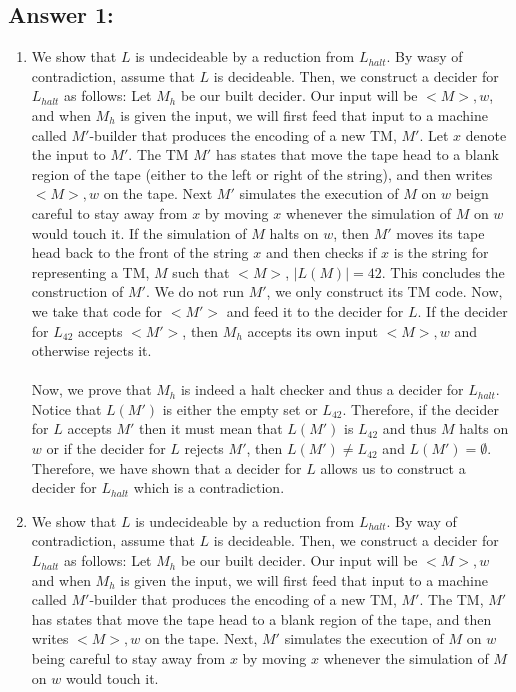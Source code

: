 \documentclass[12pt]{article}
\begin{document}
\subsection*{Answer 1:}
\begin{enumerate}
	\item We show that $L$ is undecideable by a reduction from $L_{halt}$. By wasy of contradiction, assume that $L$ is decideable. Then, we construct a decider for $L_{halt}$ as follows: 
	Let $M_h$ be our built decider. Our input will be $<M>, w$, and when $M_h$ is given the input, we will first feed that input to a machine called $M'$-builder that produces the encoding of a new 
	TM, $M'$. Let $x$ denote the input to $M'$. The TM $M'$ has states that move the tape head to a blank region of the tape (either to the left or right of the string), and then writes $<M>,w$ on the tape.
	Next $M'$ simulates the execution of $M$ on $w$ beign careful to stay away from $x$ by moving $x$ whenever the simulation of $M$ on $w$ would touch it. If the simulation of $M$ halts on $w$, then $M'$ moves its 
	tape head back to the front of the string $x$ and then checks if $x$ is the string for representing a TM, $M$ such that $<M>$, $|L(M)| = 42$. This concludes the construction of $M'$. We do not run $M'$, we only construct its TM code. Now, we take that code for $<M'>$ and feed it to the decider for $L$.
	If the decider for $L_{42}$ accepts $<M'>$, then $M_h$ accepts its own input $<M>, w$ and otherwise rejects it.\\\\
	Now, we prove that $M_h$ is indeed a halt checker and thus a decider for $L_{halt}$. Notice that $L(M')$ is either the empty set or $L_{42}$. Therefore, if the decider for $L$ accepts $M'$ then it must mean that $L(M')$ is $L_{42}$
	and thus $M$ halts on $w$ or if the decider for $L$ rejects $M'$, then $L(M') \neq L_{42}$ and $L(M') = \emptyset$. Therefore, we have shown that a decider for $L$ allows us to construct a decider for $L_{halt}$ which is a contradiction.
	\item We show that $L$ is undecideable by a reduction from $L_{halt}$. By way of contradiction, assume that $L$ is decideable. Then, we construct a decider for $L_{halt}$ as follows: Let $M_h$ be our built decider. Our input will be $<M>,w$ and when $M_h$ is given the input,
	we will first feed that input to a machine called $M'$-builder that produces the encoding of a new TM, $M'$. The TM, $M'$ has states that move the tape head to a blank region of the tape, and then writes $<M>, w$ on the tape. Next, $M'$ simulates the execution of $M$ on $w$ being careful to stay away from $x$ by moving $x$ whenever the simulation of $M$ on $w$ would touch it.

\end{enumerate}
\end{document}

